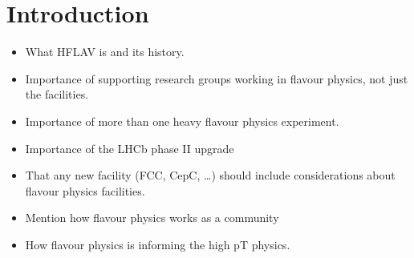 \documentclass[12pt,a4paper]{article}
\begin{document}
\section{Introduction}
\label{sec:Introduction}
 
\begin{itemize}
    \item What HFLAV is and its history.
    \item Importance of supporting research groups working in flavour physics, not just the facilities.
    \item Importance of more than one heavy flavour physics experiment.
    \item Importance of the LHCb phase II upgrade
    \item That any new facility (FCC, CepC, …) should include considerations about flavour physics facilities.
    \item Mention how flavour physics works as a community
    \item How flavour physics is informing the high pT physics.
\end{itemize}



 
\end{document}
